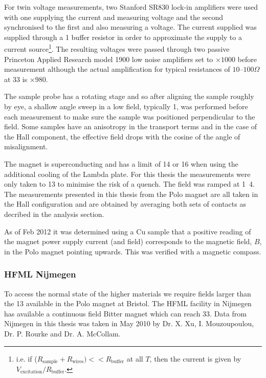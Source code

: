For twin voltage measurements, two Stanford SR830 lock-in amplifiers were used with one supplying the current and measuring voltage and the second synchronised to the first and also measuring a voltage. The current supplied was supplied through a \unit{1}{\kilo\ohm} buffer resistor in order to approximate the supply to a current source\footnote{i.e. if ($R_{\textrm{sample}} + R_{\textrm{wires}}) << R_{\textrm{buffer}} $ at all $T$, then the current is given by $V_{\textrm{excitation}}/R_{\textrm{buffer}}$.}. The resulting voltages were passed through two passive Princeton Applied Research model 1900 low noise amplifiers set to $\times1000$ before measurement although the actual amplification for typical resistances of $10$--$100\Omega$ at \unit{33}{\hertz} is $\times 980$.

The sample probe has a rotating stage and so after aligning the sample roughly by eye, a shallow angle sweep in a low field, typically \unit{1}{\tesla}, was performed before each measurement to make sure the sample was positioned perpendicular to the field. Some samples have an anisotropy in the transport terms and in the case of the Hall component, the effective field drops with the cosine of the angle of misalignment.

The magnet is superconducting and has a limit of \unit{14}{\tesla} or \unit{16}{\tesla} when using the additional cooling of the Lambda plate. For this thesis the measurements were only taken to \unit{13}{\tesla} to minimise the risk of a quench. The field was ramped at \unit{1.4}{\tesla\per\minute}. The measurements presented in this thesis from the Polo magnet are all taken in the Hall configuration and are obtained by averaging both sets of contacts as decribed in the analysis section.

As of Feb 2012 it was determined using a Cu sample that a positive reading of the magnet power supply current (and field) corresponds to the magnetic field, $B$, in the Polo magnet pointing upwards. This was verified with a magnetic compass.


\subsubsection{\ac{HFML} Nijmegen}

To access the normal state of the higher \Tc materials we require fields larger than the \unit{13}{\tesla} available in the Polo magnet at Bristol. The \ac{HFML} facility in Nijmegen has available a continuous field Bitter magnet which can reach \unit{33}{\tesla}. Data from Nijmegen in this thesis was taken in May 2010 by Dr. X. Xu, I. Mouzoupoulou, Dr. P. Rourke and Dr. A. McCollam.

